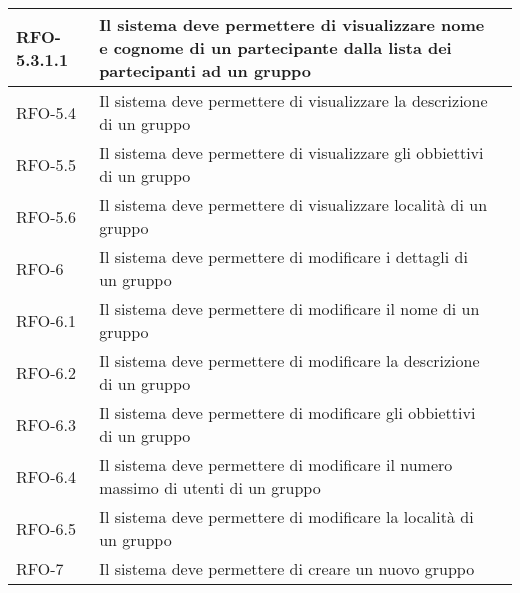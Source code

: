 \begin{center}
{\begin{longtable}{
        |>{\centering\arraybackslash}p{60pt}
        |>{\centering\arraybackslash}p{220pt}
        |>{\centering\arraybackslash}p{60pt}|}
        RFO-5.3.1.1     & Il sistema deve permettere di visualizzare nome e cognome di un partecipante dalla lista dei partecipanti ad un gruppo & \nameref{subsubsub:visualizzazione-singolo-partecipante-gruppo}\\
        \hline
        
        RFO-5.4     & Il sistema deve permettere di visualizzare la descrizione di un gruppo & \nameref{sub:visualizzazione-descrizione-gruppo}\\
        \hline
        
        RFO-5.5     & Il sistema deve permettere di visualizzare gli obbiettivi di un gruppo & \nameref{sub:visualizzazione-obbiettivi-gruppo}\\
        \hline
        
        RFO-5.6     & Il sistema deve permettere di visualizzare  località di un gruppo & \nameref{sub:visualizzazione-località-gruppo}\\
        \hline
        
        RFO-6     & Il sistema deve permettere di modificare i dettagli di un gruppo & \nameref{uc:scenario-modifica-gruppo}\\
        \hline
        
        RFO-6.1     & Il sistema deve permettere di modificare il nome di un gruppo & \nameref{sub:modifica-nome-gruppo}\\
        \hline
        
        RFO-6.2     & Il sistema deve permettere di modificare la descrizione di un gruppo & \nameref{sub:modifica-descrizione-gruppo}\\
        \hline
        
        
        RFO-6.3     & Il sistema deve permettere di modificare gli obbiettivi di un gruppo & \nameref{sub:modifica-obbiettivi-gruppo}\\
        \hline
        
        
        RFO-6.4     & Il sistema deve permettere di modificare il numero massimo di utenti di un gruppo & \nameref{sub:modifica-numero-utenti-gruppo}\\
        \hline
        
        RFO-6.5     & Il sistema deve permettere di modificare la località di un gruppo & \nameref{sub:modifica-località-gruppo}\\
        \hline
        
        
        RFO-7     & Il sistema deve permettere di creare un nuovo gruppo & \nameref{uc:scenario-creazione-nuovo-gruppo}\\
        \hline
        

\end{longtable}}
\end{center}
